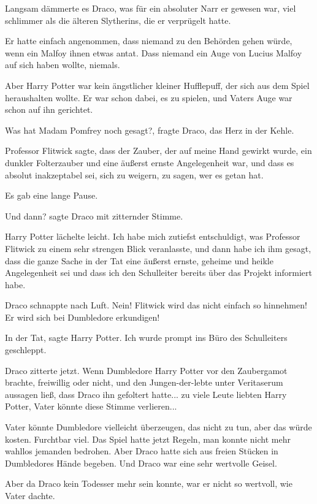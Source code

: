 Langsam dämmerte es Draco, was für ein absoluter Narr er gewesen war, viel
schlimmer als die älteren Slytherins, die er verprügelt hatte.

Er hatte einfach angenommen, dass niemand zu den Behörden gehen würde, wenn ein
Malfoy ihnen etwas antat. Dass niemand ein Auge von Lucius Malfoy auf sich haben
wollte, niemals.

Aber Harry Potter war kein ängstlicher kleiner Hufflepuff, der sich aus dem
Spiel heraushalten wollte. Er war schon dabei, es zu spielen, und Vaters Auge
war schon auf ihn gerichtet.

\glqq{}Was hat Madam Pomfrey noch gesagt?\grqq{}, fragte Draco, das Herz in der
Kehle.

\glqq{}Professor Flitwick sagte, dass der Zauber, der auf meine Hand gewirkt
wurde, ein dunkler Folterzauber und eine äußerst ernste Angelegenheit war, und
dass es absolut inakzeptabel sei, sich zu weigern, zu sagen, wer es getan
hat.\grqq{}

Es gab eine lange Pause.

\glqq{}Und dann?\grqq{} sagte Draco mit zitternder Stimme.

Harry Potter lächelte leicht. \glqq{}Ich habe mich zutiefst entschuldigt, was
Professor Flitwick zu einem sehr strengen Blick veranlasste, und dann habe ich
ihm gesagt, dass die ganze Sache in der Tat eine äußerst ernste, geheime und
heikle Angelegenheit sei und dass ich den Schulleiter bereits über das Projekt
informiert habe.\grqq{}

Draco schnappte nach Luft. \glqq{}Nein! Flitwick wird das nicht einfach so
hinnehmen! Er wird sich bei Dumbledore erkundigen!\grqq{}

\glqq{}In der Tat\grqq{}, sagte Harry Potter. \glqq{}Ich wurde prompt ins Büro
des Schulleiters geschleppt.\grqq{}

Draco zitterte jetzt. Wenn Dumbledore Harry Potter vor den Zaubergamot brachte,
freiwillig oder nicht, und den Jungen-der-lebte unter Veritaserum aussagen ließ,
dass Draco ihn gefoltert hatte... zu viele Leute liebten Harry Potter, Vater
könnte diese Stimme verlieren...

Vater könnte Dumbledore vielleicht überzeugen, das nicht zu tun, aber das würde
kosten. Furchtbar viel. Das Spiel hatte jetzt Regeln, man konnte nicht mehr
wahllos jemanden bedrohen. Aber Draco hatte sich aus freien Stücken in
Dumbledores Hände begeben. Und Draco war eine sehr wertvolle Geisel.

Aber da Draco kein Todesser mehr sein konnte, war er nicht so wertvoll, wie
Vater dachte.

